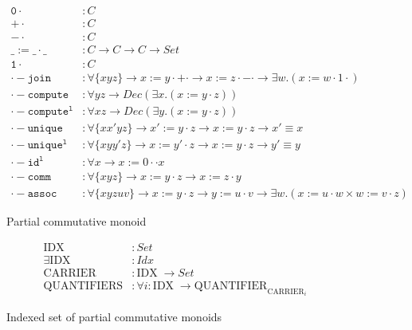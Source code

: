 \documentclass[a4paper,UKenglish,cleveref, autoref, thm-restate,authorcolumns]{lipics-v2019}
\newcommand{\op}[3]{#1 := #2 \cdot #3}
\newcommand{\Idx}{\mathrm{IDX}\;}
\newcommand{\Carrier}{\mathrm{CARRIER}}
\newcommand{\Quantifier}{\mathrm{QUANTIFIER}}
\newcommand{\Quantifiers}{\mathrm{QUANTIFIERS}}
\newcommand{\constr}[1]{\mathtt{#1}}
\begin{document}
\begin{figure}[h]
\begin{equation}
\begin{split}
  \constr{0\cdot}          &: C \\
  \constr{+\cdot}          &: C \\
  \constr{-\cdot}          &: C \\
  \constr{\op{\_}{\_}{\_}} &: C \to C \to C \to Set \\
  \constr{1\cdot}          &: C \\
  \constr{\cdot-join}      &: \forall \{x y z\} \to \op{x}{y}{+\cdot} \to \op{x}{z}{-\cdot} \to \exists w . (\op{x}{w}{1\cdot}) \\
  \constr{\cdot-compute}   &: \forall y z \to Dec (\exists x . (\op{x}{y}{z})) \\
  \constr{\cdot-compute^l} &: \forall x z \to Dec (\exists y . (\op{x}{y}{z})) \\
  \constr{\cdot-unique}    &: \forall \{x x' y z\} \to \op{x'}{y}{z} \to \op{x}{y}{z} \to x' \equiv x \\
  \constr{\cdot-unique^l}  &: \forall \{x y y' z\} \to \op{x}{y'}{z} \to \op{x}{y}{z} \to y' \equiv y \\
  \constr{\cdot-id^l}      &: \forall x \to \op{x}{0\cdot}{x} \\
  \constr{\cdot-comm}      &: \forall \{x y z\} \to \op{x}{y}{z} \to \op{x}{z}{y} \\
  \constr{\cdot-assoc}     &: \forall \{x y z u v\} \to \op{x}{y}{z} \to \op{y}{u}{v} \to \exists w . (\op{x}{u}{w} \times \op{w}{v}{z})
\end{split}
\end{equation}
\caption{Partial commutative monoid}
\end{figure}

\begin{figure}[h]
\begin{equation}
\begin{split}
  \constr{\Idx}          &: Set \\
  \constr{\exists \Idx}  &: Idx \\
  \constr{\Carrier}      &: \Idx \to Set \\
  \constr{\Quantifiers}  &: \forall i : \Idx \to \Quantifier_{\Carrier_i}
\end{split}
\end{equation}
\caption{Indexed set of partial commutative monoids}
\end{figure}
\end{document}

